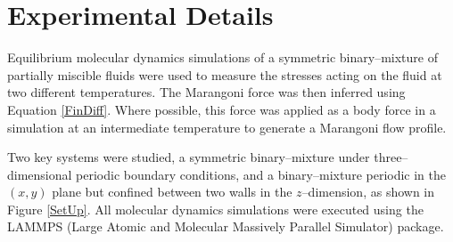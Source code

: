 \section{Experimental Details}

Equilibrium molecular dynamics simulations of a symmetric binary--mixture of partially miscible fluids were used to measure the stresses acting on the fluid at two different temperatures.
The Marangoni force was then inferred using Equation \ref{FinDiff}.
Where possible, this force was applied as a body force in a simulation at an intermediate temperature to generate a Marangoni flow profile.

Two key systems were studied, a symmetric binary–mixture under three--dimensional periodic boundary conditions, and a binary--mixture periodic in the $(x,y)$ plane but confined between two walls in the $z$--dimension, as shown in Figure \ref{SetUp}.
All molecular dynamics simulations were executed using the LAMMPS (Large Atomic and Molecular Massively Parallel Simulator) package.\cite{LAMMPS}  
